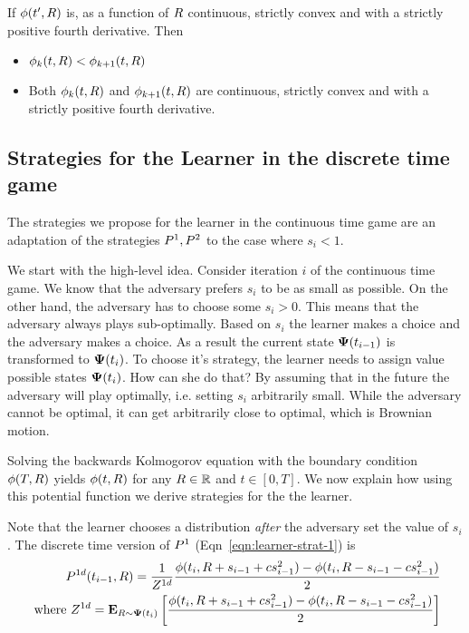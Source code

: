 \documentclass[12pt]{article} %
\begin{document}
\begin{lemma} \label{lemma:n-strictly-convex}
If $\phi(t',R)$ is, as a function of $R$ continuous, strictly
convex and with a strictly positive fourth derivative. Then
\begin{itemize}
\item $\phi_k(t,R) < \phi_{k+1}(t,R)$
  \item Both $\phi_k(t,R)$ and $\phi_{k+1}(t,R)$ are continuous, strictly
convex and with a strictly positive fourth derivative.
\end{itemize}
\end{lemma}

\subsection{Strategies for the Learner in the discrete time game}
The strategies we propose for the learner in the continuous time game
are an adaptation of the strategies $P^1,P^2$ to the
case where $s_i<1$.

We start with the high-level idea. Consider iteration $i$ of the
continuous time game. We know that the adversary prefers $s_i$ to be
as small as possible. On the other hand, the adversary has to choose
some $s_i>0$. This means that the adversary always plays
sub-optimally. Based on $s_i$ the learner makes a choice and the
adversary makes a choice. As a result the current state ${\bf \Psi}(t_{i-1})$
is transformed to ${\bf \Psi}(t_i)$. To choose it's strategy, the learner
needs to assign value possible states ${\bf \Psi}(t_i)$. How can she do
that? By assuming that in the future the adversary will play
optimally, i.e. setting $s_i$ arbitrarily small. While the adversary
cannot be optimal, it can get arbitrarily close to optimal, which is
Brownian motion.

Solving the backwards Kolmogorov equation with the boundary condition
$\phi(T,R)$ yields $\phi(t,R)$ for any
$R \in \mathbb{R}$ and $t \in [0,T]$. We now explain how using this
potential function we derive strategies for the the learner. 

Note that the learner chooses a distribution {\em after} the adversary
set the value of $s_i$. The discrete time version of $P^1$
(Eqn~\ref{eqn:learner-strat-1}) is 
\begin{eqnarray} \label{eqn:learner-strat-1c}
  P^{1d}(t_{i-1},R) = \frac{1}{Z^{1d}}
  \frac{\phi(t_i,R+s_{i-1}+cs_{i-1}^2) -
  \phi(t_i,R-s_{i-1}-cs_{i-1}^2)}{2} \\
  \mbox{ where } Z^{1d} = {\bf E}_{R \sim {\bf \Psi}(t_i)}\left[ \frac{\phi(t_i,R+s_{i-1}+cs_{i-1}^2) -
  \phi(t_i,R-s_{i-1}-cs_{i-1}^2)}{2} \right] \nonumber
\end{eqnarray}
\end{document}
